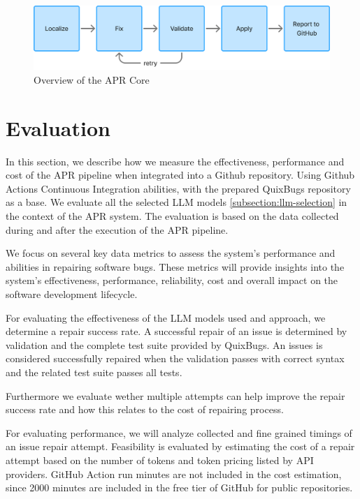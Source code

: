 \begin{figure}[H]
    \centering
    \includegraphics[width=1\textwidth]{images/flowcharts/apr_core_overview.png}
    \caption{Overview of the APR Core}
    \label{fig:apr-core-overview}
\end{figure}



\section{Evaluation} \label{section:evaluation}
In this section, we describe how we measure the effectiveness, performance and cost of the APR pipeline when integrated into a Github repository. Using Github Actions Continuous Integration abilities, with the prepared QuixBugs repository as a base. We evaluate all the selected LLM models \ref{subsection:llm-selection} in the context of the APR system. The evaluation is based on the data collected during and after the execution of the APR pipeline.

We focus on several key data metrics to assess the system's performance and abilities in repairing software bugs. These metrics will provide insights into the system's effectiveness, performance, reliability, cost and overall impact on the software development lifecycle.

For evaluating the effectiveness of the LLM models used and approach, we determine a repair success rate. A successful repair of an issue is determined by validation and the complete test suite provided by QuixBugs. An issues is considered successfully repaired when the validation passes with correct syntax and the related test suite passes all tests.

Furthermore we evaluate wether multiple attempts can help improve the repair success rate and how this relates to the cost of repairing process.

For evaluating performance, we will analyze collected and fine grained timings of an issue repair attempt. Feasibility is evaluated by estimating the cost of a repair attempt based on the number of tokens and token pricing listed by API providers. GitHub Action run minutes are not included in the cost estimation, since 2000 minutes are included in the free tier of GitHub for public repositories.

